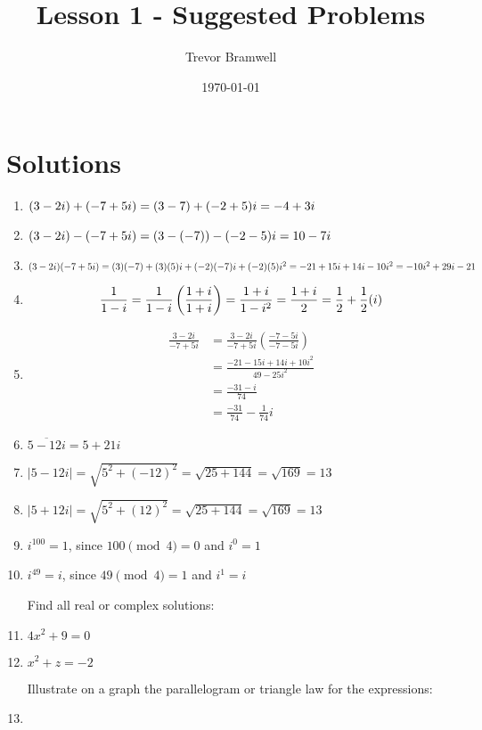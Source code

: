 \documentclass[12pt]{article}
\title{Lesson 1 - Suggested Problems}
\author{
    Trevor Bramwell \\
}
\date{\today}
\begin{document}
\maketitle


\section*{Solutions}
\begin{enumerate}
\item $
    (3-2i)+(-7+5i) = (3-7)+(-2+5)i \\
    = -4+3i
$
\item $
    (3-2i)-(-7+5i) = (3-(-7))-(-2-5)i \\
    = 10-7i
$
\item $
    (3-2i)(-7+5i) = (3)(-7)+(3)(5)i+(-2)(-7)i+(-2)(5)i^2 \\
    = -21+15i+14i-10i^2 \\
    = -10i^2+29i-21
$
\item \[
    \frac{1}{1-i} = \frac{1}{1-i}\left(\frac{1+i}{1+i}\right)
    = \frac{1+i}{1-i^2}
    = \frac{1+i}{2} \\
    = \frac{1}{2}+\frac{1}{2}(i)
\]
\item \begin{align*}
    \frac{3-2i}{-7+5i} &= \frac{3-2i}{-7+5i}\left(\frac{-7-5i}{-7-5i}\right) \\
    &= \frac{-21-15i+14i+10i^2}{49-25i^2} \\
    &= \frac{-31-i}{74} \\
    &= \frac{-31}{74}-\frac{1}{74}i
\end{align*}
\item $ \overline{5-12i} = 5+21i $
\item $ |5-12i| = \sqrt{5^2+(-12)^2} = \sqrt{25+144} = \sqrt{169} = 13 $
\item $ |5+12i| = \sqrt{5^2+(12)^2} = \sqrt{25+144} = \sqrt{169} = 13 $
\item $ i^{100} = 1 $, since $100 \pmod 4 = 0$ and $i^0 = 1$
\item $ i^{49} = i $, since $49 \pmod 4 = 1$ and $i^1 = i$

Find all real or complex solutions:
\item $ 4x^2+9=0 $
\item $ x^2+z=-2 $

Illustrate on a graph the parallelogram or triangle law for the expressions:
\item {}
\end{enumerate}
\end{document}
